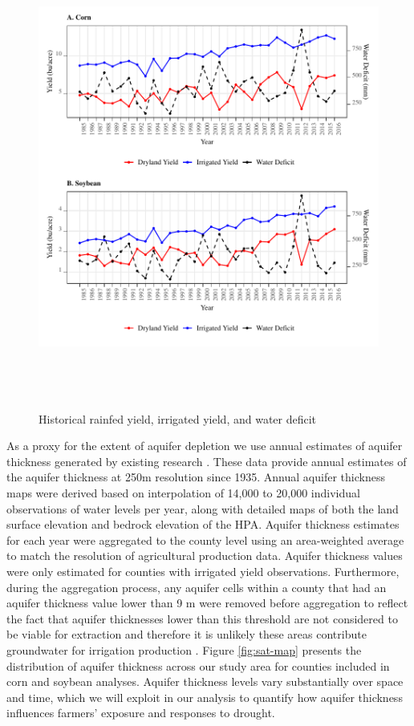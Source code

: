 \documentclass[
]{article}
\begin{document}
\begin{figure}[H]

{\centering \includegraphics[width=750px,height=6in,]{../../Figures/g_y_wd_all} 

}

\caption{Historical rainfed yield, irrigated yield, and water deficit}\label{fig:deficit-yield-hist}
\end{figure}

As a proxy for the extent of aquifer depletion we use annual estimates of aquifer thickness generated by existing research \citep{haacker2016water,haacker2023}. These data provide annual estimates of the aquifer thickness at 250m resolution since 1935. Annual aquifer thickness maps were derived based on interpolation of 14,000 to 20,000 individual observations of water levels per year, along with detailed maps of both the land surface elevation and bedrock elevation of the HPA. Aquifer thickness estimates for each year were aggregated to the county level using an area-weighted average to match the resolution of agricultural production data. Aquifer thickness values were only estimated for counties with irrigated yield observations. Furthermore, during the aggregation process, any aquifer cells within a county that had an aquifer thickness value lower than 9 m were removed before aggregation to reflect the fact that aquifer thicknesses lower than this threshold are not considered to be viable for extraction and therefore it is unlikely these areas contribute groundwater for irrigation production \citep{fenichel2016measuring, haacker2016water, deines2020transitions}. Figure \ref{fig:sat-map} presents the distribution of aquifer thickness across our study area for counties included in corn and soybean analyses. Aquifer thickness levels vary substantially over space and time, which we will exploit in our analysis to quantify how aquifer thickness influences farmers' exposure and responses to drought.
\end{document}
